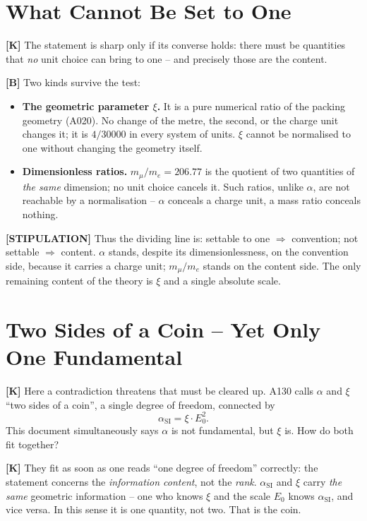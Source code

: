 \section{What Cannot Be Set to One}

\textbf{[K]} The statement is sharp only if its converse holds: there must be
quantities that \emph{no} unit choice can bring to one -- and precisely those are
the content.

\textbf{[B]} Two kinds survive the test:
\begin{itemize}
  \item \textbf{The geometric parameter $\xi$.} It is a pure numerical ratio of
    the packing geometry (A020). No change of the metre, the second, or the charge
    unit changes it; it is $4/30000$ in every system of units. $\xi$ cannot be
    normalised to one without changing the geometry itself.
  \item \textbf{Dimensionless ratios.} $m_\mu/m_e = 206{.}77$ is the quotient of
    two quantities of \emph{the same} dimension; no unit choice cancels it. Such
    ratios, unlike $\alpha$, are not reachable by a normalisation -- $\alpha$
    conceals a charge unit, a mass ratio conceals nothing.
\end{itemize}

\textbf{[STIPULATION]} Thus the dividing line is: settable to one $\Rightarrow$
convention; not settable $\Rightarrow$ content. $\alpha$ stands, despite its
dimensionlessness, on the convention side, because it carries a charge unit;
$m_\mu/m_e$ stands on the content side. The only remaining content of the theory
is $\xi$ and a single absolute scale.

\section{Two Sides of a Coin -- Yet Only One Fundamental}

\textbf{[K]} Here a contradiction threatens that must be cleared up. A130 calls
$\alpha$ and $\xi$ ``two sides of a coin'', a single degree of freedom, connected by
\[
  \alpha_\text{SI} = \xi\cdot E_0^2 .
\]
This document simultaneously says $\alpha$ is not fundamental, but $\xi$ is.
How do both fit together?

\textbf{[K]} They fit as soon as one reads ``one degree of freedom'' correctly:
the statement concerns the \emph{information content}, not the \emph{rank}.
$\alpha_\text{SI}$ and $\xi$ carry \emph{the same} geometric information -- one
who knows $\xi$ and the scale $E_0$ knows $\alpha_\text{SI}$, and vice versa. In
this sense it is one quantity, not two. That is the coin.

